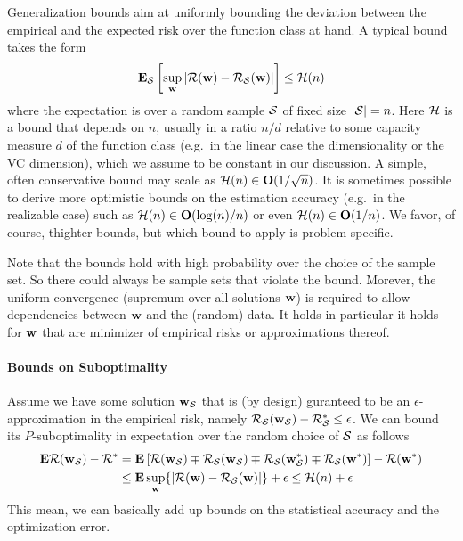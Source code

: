 \documentclass{article}
\renewcommand{\S}{{\cal S}}
\newcommand{\bigO}{{\bf O}}
\newcommand{\w}{{\bf w}}
\newcommand{\risk}{{\cal R}}
\newcommand{\bound}{{\cal H}}
\newcommand{\E}{{\bf E}}
\begin{document}
Generalization bounds aim at uniformly bounding the deviation between the empirical and the expected risk over the function class at hand. A typical bound takes the form
\begin{align}
\E_\S \left[ \sup_{\w} \left| \risk(\w) - \risk_\S(\w) \right| \right]  \leq
\bound(n) \label{eq:bound}
\end{align} 
where the expectation is over a random sample $\S$ of fixed size $|\S|=n$. Here $\bound$ is a bound that depends on $n$, usually in a ratio $n/d$ relative to some capacity measure $d$ of the function class (e.g.~in the linear case the dimensionality or the VC dimension), which we assume to be constant in our discussion.  A simple, often conservative bound may scale as $\bound(n) \in \bigO(1/\sqrt{n})$. It is sometimes possible to derive more optimistic bounds on the estimation accuracy (e.g.~in the realizable case) such as $\bound(n) \in \bigO(\log(n)/n)$ or even $\bound(n) \in\bigO(1/n)$.  We favor, of course, thighter bounds, but which bound to apply is problem-specific.

Note that the bounds hold with high probability over the choice of the sample set. So there could always be sample sets that violate the bound. Morever, the uniform convergence (supremum over all solutions $\w$) is required to allow dependencies between $\w$  and the (random) data. It holds in particular it holds for $\w$ that are minimizer of empirical risks or approximations thereof. 

\paragraph{Bounds on Suboptimality} 

Assume we have some solution $\w_\S$ that is (by design) guranteed to be an $\epsilon$-approximation in the empirical risk, namely $\risk_\S(\w_\S) - \risk_\S^* \le \epsilon$.  We can bound its $P$-suboptimality in expectation over the random choice of $\S$ as follows 
\begin{align}
\label{eq:exprisk-bound}
\E \risk(\w_\S) - \risk^*  & = 
\E \left[ \risk(\w_\S) \mp \risk_\S(\w_\S) \mp \risk_\S(\w_\S^*) \mp \risk_\S(\w^*) \right]   - \risk(\w^*)
\\ & \le \E \sup_\w \{ | \risk(\w) -  \risk_\S(\w) | \} + \epsilon  \le  \bound(n) + \epsilon 
\nonumber
\end{align}
This mean, we can basically add up bounds on the statistical accuracy and the optimization error. 
\end{document}
